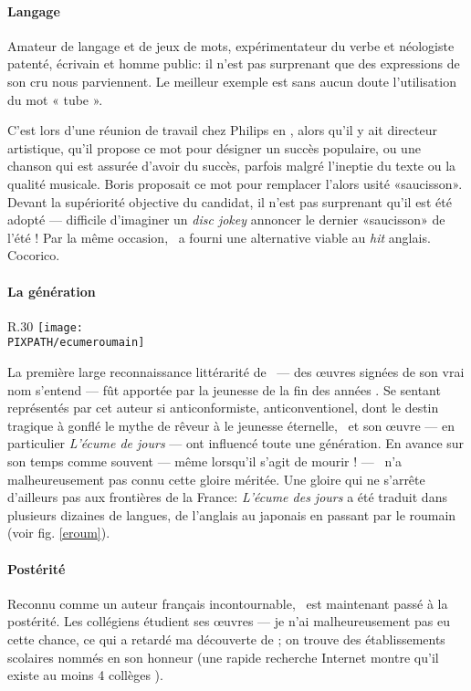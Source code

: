 \paragraph{Langage}

Amateur de langage et de jeux de mots, expérimentateur du verbe et néologiste
patenté, écrivain et homme public: il n'est pas surprenant que des expressions
de son cru nous parviennent.
Le meilleur exemple est sans aucun doute l'utilisation du mot « tube ».

C'est lors d'une réunion de travail chez Philips en , alors qu'il y ait
directeur artistique, qu'il propose ce mot pour désigner un succès populaire,
ou une chanson qui est assurée d'avoir du succès, parfois malgré l'ineptie du
texte ou la qualité musicale. Boris proposait ce mot pour remplacer l'alors
usité «saucisson». Devant la supériorité objective du candidat, il n'est pas
surprenant qu'il est été adopté --- difficile d'imaginer un \emph{disc jokey}
annoncer le dernier «saucisson» de l'été ! Par la même occasion, \BV\ a
fourni une alternative viable au \emph{hit} anglais. Cocorico.

\paragraph{La génération }

\begin{wrapfigure}{R}{.30\textwidth}
\centering
\texttt{[image: \\PIXPATH/ecumeroumain]}
\caption{Édition roumaine de \emph{L'écume des jours}. Traduction de Sorin Mărculescu}
\label{eroum}
\end{wrapfigure}
La première large reconnaissance littérarité de \BV\ --- des œuvres signées
de son vrai nom s'entend --- fût apportée par la jeunesse de la fin des années .
Se sentant représentés par cet auteur si anticonformiste, anticonventionel, dont
le destin tragique à gonflé le mythe de rêveur à le jeunesse éternelle, \BV\ 
et son œuvre --- en particulier \emph{L'écume de jours} --- ont influencé toute une
génération. En avance sur son temps comme souvent --- même lorsqu'il s'agit de
mourir ! --- \BV\ n'a malheureusement pas connu cette gloire méritée.
Une gloire qui ne s'arrête d'ailleurs pas aux frontières de la France: \emph{L'écume
des jours} a été traduit dans plusieurs dizaines de langues, de l'anglais au japonais en passant
par le roumain (voir fig. \ref{eroum}).

\paragraph{Postérité}
Reconnu comme un auteur français incontournable, \BV\ est maintenant passé à la postérité.
Les collégiens étudient ses \oe{}uvres --- je n'ai malheureusement pas eu cette chance,
ce qui a retardé ma découverte de \BV; on trouve des établissements scolaires nommés en
son honneur (une rapide recherche Internet montre qu'il existe au moins 4 collèges \BV).

